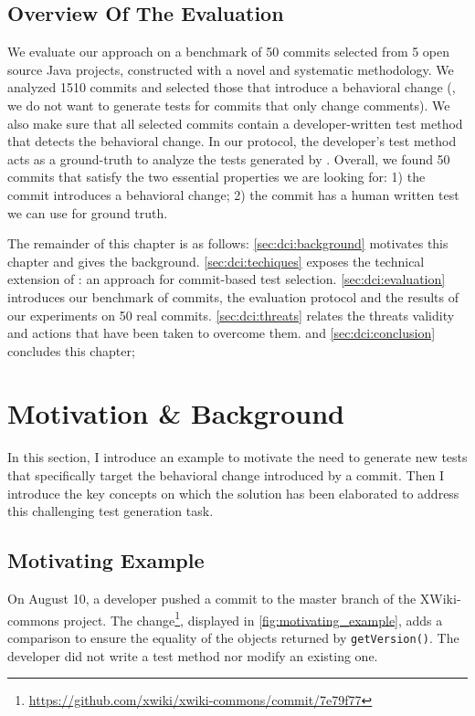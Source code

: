 \subsection{Overview Of The Evaluation}
\label{subsec:dci:introduction:evaluation}
We evaluate our approach on a benchmark of 50 commits selected from 5 open source Java projects, constructed with a novel and systematic methodology.
We analyzed 1510 commits and selected those that introduce a behavioral change (\eg, we do not want to generate tests for commits that only change comments).
We also make sure that all selected commits contain a developer-written test method that detects the behavioral change.
In our protocol, the developer's test method acts as a ground-truth to analyze the tests generated by \DCI.
Overall, we found 50 commits that satisfy the two essential properties we are looking for:
1) the commit introduces a behavioral change;
2) the commit has a human written test we can use for ground truth.

The remainder of this chapter is as follows:
\autoref{sec:dci:background} motivates this chapter and gives the background.
\autoref{sec:dci:techiques} exposes the technical extension of \dspot: an approach for commit-based test selection. 
\autoref{sec:dci:evaluation} introduces our benchmark of commits, the evaluation protocol and the results of our experiments on 50 real commits. 
\autoref{sec:dci:threats} relates the threats validity and actions that have been taken to overcome them. 
and \autoref{sec:dci:conclusion} concludes this chapter;

\section{Motivation \& Background}
\label{sec:dci:background}

In this section, I introduce an example to motivate the need to generate new tests that specifically target the behavioral change introduced by a commit.
Then I introduce the key concepts on which the solution has been elaborated to address this challenging test generation task.

\subsection{Motivating Example}
\label{subsec:dci:background:example}

On August 10, a developer pushed a commit to the master branch of the XWiki-commons project. 
The change\footnote{\url{https://github.com/xwiki/xwiki-commons/commit/7e79f77}}, displayed in \autoref{fig:motivating_example}, adds a comparison to ensure the equality of the objects returned by \texttt{getVersion()}.
The developer did not write a test method nor modify an existing one. 

